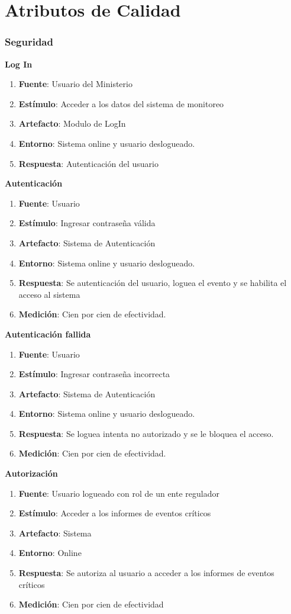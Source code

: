 \section{Atributos de Calidad}

\subsubsection{Seguridad}

{\bf Log In}
\begin{enumerate}
\item {\bf Fuente}: Usuario del Ministerio
\item {\bf Estímulo}: Acceder a los datos del sistema de monitoreo
\item {\bf Artefacto}: Modulo de LogIn
\item {\bf Entorno}: Sistema online y usuario deslogueado. 
\item {\bf Respuesta}: Autenticación del usuario
\end{enumerate}

{\bf Autenticación}
\begin{enumerate}
\item {\bf Fuente}: Usuario
\item {\bf Estímulo}: Ingresar contraseña válida
\item {\bf Artefacto}: Sistema de Autenticación
\item {\bf Entorno}: Sistema online y usuario deslogueado. 
\item {\bf Respuesta}: Se autenticación del usuario, loguea el evento y se habilita el acceso al sistema
\item {\bf Medición}: Cien por cien de efectividad.
\end{enumerate}

\textbf{Autenticación fallida}
\begin{enumerate}
\item {\bf Fuente}: Usuario
\item {\bf Estímulo}: Ingresar contraseña incorrecta
\item {\bf Artefacto}: Sistema de Autenticación
\item {\bf Entorno}: Sistema online y usuario deslogueado. 
\item {\bf Respuesta}: Se loguea intenta no autorizado y se le bloquea el acceso. 
\item {\bf Medición}: Cien por cien de efectividad.
\end{enumerate}

{\bf Autorización}
\begin{enumerate}
\item {\bf Fuente}: Usuario logueado con rol de un ente regulador
\item {\bf Estímulo}: Acceder a los informes de eventos críticos
\item {\bf Artefacto}: Sistema
\item {\bf Entorno}: Online
\item {\bf Respuesta}: Se autoriza al usuario a acceder a los informes de eventos críticos
\item {\bf Medición}: Cien por cien de efectividad
\end{enumerate}

